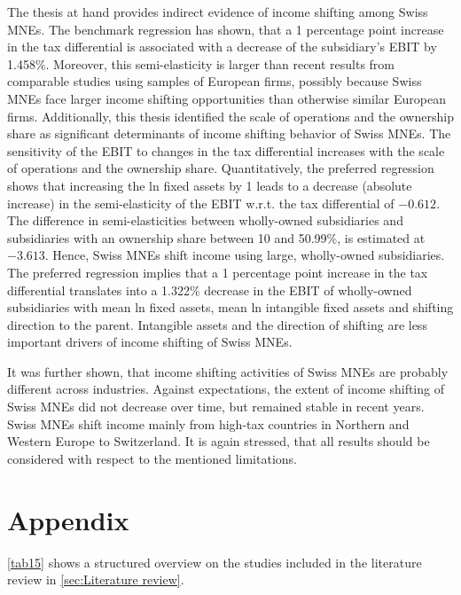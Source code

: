 \documentclass[10pt,twocolumn,oneside,cmyk]{article}
\begin{document}
The thesis at hand provides indirect evidence of income shifting among Swiss MNEs. The benchmark regression has shown, that a 1 percentage point increase in the tax differential is associated with a decrease of the subsidiary's EBIT by 1.458\%. Moreover, this semi-elasticity is larger than recent results from comparable studies using samples of European firms, possibly because Swiss MNEs face larger income shifting opportunities than otherwise similar European firms. Additionally, this thesis identified the scale of operations and the ownership share as significant determinants of income shifting behavior of Swiss MNEs. The sensitivity of the EBIT to changes in the tax differential increases with the scale of operations and the ownership share. Quantitatively, the preferred regression shows that increasing the ln fixed assets by 1 leads to a decrease (absolute increase) in the semi-elasticity of the EBIT w.r.t. the tax differential of $-0.612$. The difference in semi-elasticities between wholly-owned subsidiaries and subsidiaries with an ownership share between 10 and 50.99\%, is estimated at $-3.613$. Hence, Swiss MNEs shift income using large, wholly-owned subsidiaries. The preferred regression implies that a 1 percentage point increase in the tax differential translates into a 1.322\% decrease in the EBIT of wholly-owned subsidiaries with mean ln fixed assets, mean ln intangible fixed assets and shifting direction to the parent. Intangible assets and the direction of shifting are less important drivers of income shifting of Swiss MNEs.

It was further shown, that income shifting activities of Swiss MNEs are probably different across industries. Against expectations, the extent of income shifting of Swiss MNEs did not decrease over time, but remained stable in recent years. Swiss MNEs shift income mainly from high-tax countries in Northern and Western Europe to Switzerland. It is again stressed, that all results should be considered with respect to the mentioned limitations.
\clearpage

\printbibliography
\clearpage

\appendix
\section{Appendix }\label{app:A}
\cref{tab15} shows a structured overview on the studies included in the literature review in \cref{sec:Literature review}.
\end{document}
